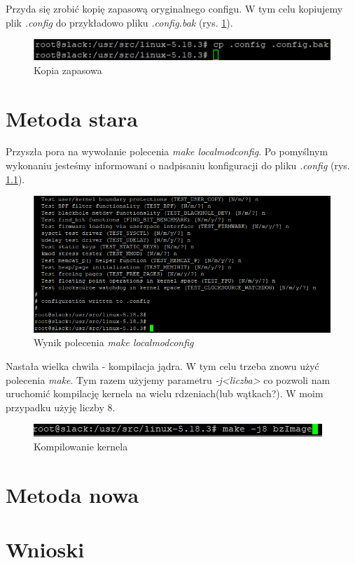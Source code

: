 \documentclass[a4paper,12pt,oneside]{book} %
\begin{document}
Przyda się zrobić kopię zapasową oryginalnego configu. W tym celu kopiujemy plik \emph{.config} do przykładowo pliku \emph{.config.bak} (rys. \ref{config-bak}).
\begin{figure}[h]
	\centering
	\includegraphics[scale=0.6]{05-config-bak}
	\caption{Kopia zapasowa}
	\label{config-bak}
\end{figure}

\chapter{Metoda stara}
\label{Metoda stara}

Przyszła pora na wywołanie polecenia \emph{make localmodconfig}. Po pomyślnym wykonaniu jesteśmy informowani o nadpisaniu konfiguracji do pliku \emph{.config} (rys. \ref{old-config}).

\begin{figure}[h]
	\centering
	\includegraphics[scale=0.6]{06-old-config}
	\caption{Wynik polecenia \emph{make localmodconfig}}
	\label{old-config}
\end{figure}

Nastała wielka chwila - kompilacja jądra. W tym celu trzeba znowu użyć polecenia \emph{make}. Tym razem użyjemy parametru \emph{-j<liczba>} co pozwoli nam uruchomić kompilację kernela na wielu rdzeniach(lub wątkach?). W moim przypadku użyję liczby 8. 

\begin{figure}[h]
	\centering
	\includegraphics[scale=0.6]{08-bzimage}
	\caption{Kompilowanie kernela}
	\label{bzimage}
\end{figure}

\chapter{Metoda nowa}
\label{Metoda nowa}

\chapter{Wnioski}
\label{Wnioski}



\end{document}
